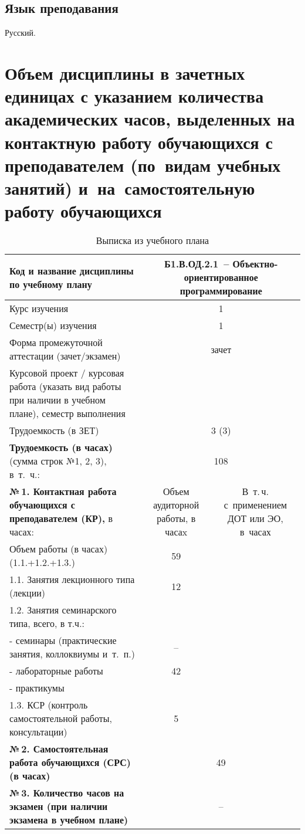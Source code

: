 \documentclass[a4paper,12pt]{article}
\begin{document}
\subsection{Язык преподавания} 
  Русский.
  



\newpage

\section{Объем дисциплины в зачетных единицах с указанием количества академических часов, выделенных на контактную работу обучающихся с преподавателем (по~видам учебных занятий) и~на~самостоятельную работу обучающихся}

\begin{table}[H]
\caption{Выписка из учебного плана} 
\begin{tabular}{|p{9cm}|c|c|}
\hline
Код и название дисциплины по учебному плану & \multicolumn{2}{p{6cm}|}{Б1.В.ОД.2.1\ -- Объектно-ориентированное программирование }\\
\hline
Курс изучения &\multicolumn{2}{c|}{ 1 }\\
\hline
Семестр(ы) изучения &\multicolumn{2}{c|}{ 1 }\\
\hline
Форма промежуточной аттестации (зачет/экзамен) &\multicolumn{2}{c|}{ зачет }\\
\hline
Курсовой проект / курсовая работа (указать вид работы при наличии в учебном плане), семестр выполнения &\multicolumn{2}{c|}{ }\\
\hline
Трудоемкость (в ЗЕТ) &\multicolumn{2}{c|}{ 3 (3) }\\
\hline
{\bf Трудоемкость (в часах)} (сумма строк №1, 2, 3), в~т.~ч.:& \multicolumn{2}{c|}{108}\\
\hline
\textbf{№\,1. Контактная работа обучающихся с преподавателем (КР),} в часах:
& \multicolumn{1}{p{3cm}|}{\centering Объем аудиторной работы, в часаx}
& \multicolumn{1}{p{3cm}|}{\centering\arraybackslash В~т.\,ч. с~применением ДОТ или ЭО, в~часах}\\
\hline  
Объем работы (в часах) (1.1.+1.2.+1.3.)& 59 & \\
\hline
1.1. Занятия лекционного типа (лекции) & 12 & \\
\hline
1.2. Занятия семинарского типа, всего, в т.ч.: & & \\
\hline
- семинары (практические занятия, коллоквиумы и~т.~п.)  & – & \\
\hline
- лабораторные работы& 42 & \\
\hline
- практикумы & & \\
\hline
1.3. КСР (контроль самостоятельной работы, консультации)& 5 & \\
\hline
{\bf №\,2. Самостоятельная работа обучающихся (СРС) (в часах)}& \multicolumn{2}{c|}{49}\\
\hline
{\bf №\,3. Количество часов на экзамен (при наличии экзамена в учебном плане)}& \multicolumn{2}{c|}{–}\\
\hline
\end{tabular}
\end{table}
\end{document}
